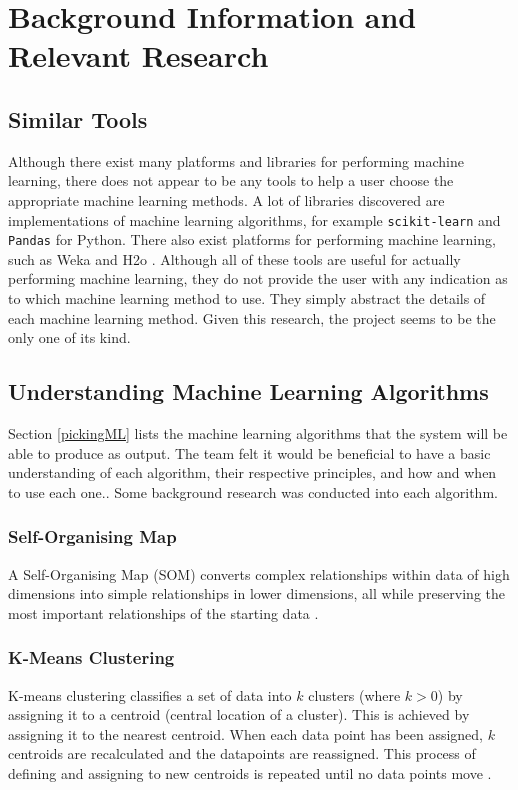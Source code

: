 \documentclass[a4paper,titlepage]{article}
\begin{document}
\section{Background Information and \\Relevant Research}

\subsection{Similar Tools}
Although there exist many platforms and libraries for performing machine learning, there does not appear to be any tools to help a user choose the appropriate machine learning methods.
A lot of libraries discovered are implementations of machine learning algorithms, for example \verb|scikit-learn| \cite{scikit-learn} and \verb|Pandas| \cite{pandas} for Python.
There also exist platforms for performing machine learning, such as Weka \cite{weka} and H2o \cite{h2o.ai}.
Although all of these tools are useful for actually performing machine learning, they do not provide the user with any indication as to which machine learning method to use.
They simply abstract the details of each machine learning method.
Given this research, the project seems to be the only one of its kind.

\subsection{Understanding Machine Learning Algorithms}
Section \ref{pickingML} lists the machine learning algorithms that the system will be able to produce as output.
The team felt it would be beneficial to have a basic understanding of each algorithm, their respective principles, and how and when to use each one..
Some background research was conducted into each algorithm.

\subsubsection*{Self-Organising Map}
A Self-Organising Map (SOM) converts complex relationships within data of high dimensions into simple relationships in lower dimensions, all while preserving the most important relationships of the starting data \cite{kohonen2005}.
\subsubsection*{K-Means Clustering}
K-means clustering classifies a set of data into $k$ clusters (where $k > 0$) by assigning it to a centroid (central location of a cluster).
This is achieved by assigning it to the nearest centroid.
When each data point has been assigned, $k$ centroids are recalculated and the datapoints are reassigned.
This process of defining and assigning to new centroids is repeated until no data points move \cite{kmeans}.
\end{document}
